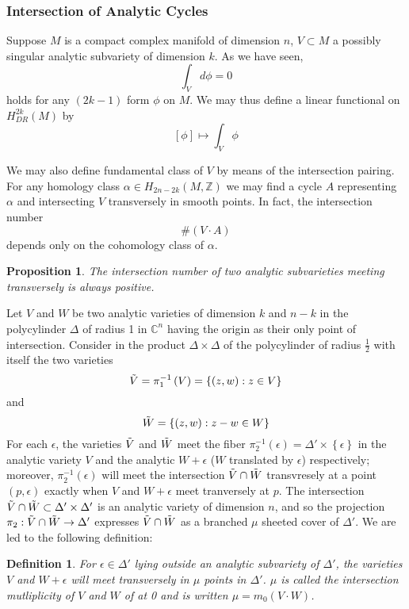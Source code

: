 \documentclass{article}
\newtheorem{defn}{Definition}
\newtheorem{prop}{Proposition}
\begin{document}
\subsubsection{Intersection of Analytic Cycles}

\indent Suppose $M$ is a compact complex manifold of dimension $n$, $V \subset M$ a possibly singular analytic subvariety of dimension $k$. As we have seen, 
\[
	\int_V d\phi = 0
\]
holds for any $(2k-1)$ form $  \phi$ on $M$. We may thus define a linear functional on $H^{2k}_{DR} (M)$ by 
\[
	\left[ \phi \right] \mapsto \int_V \phi
\]

We may also define fundamental class of $V$ by means of the intersection pairing. For any homology class $ \alpha \in H_{2n-2k} \left( M, \mathbb{Z} \right) $ we may find a cycle $A$ representing $ \alpha$ and intersecting $V$ transversely in smooth points. In fact, the intersection number
\[
	\# \left( V \cdot A \right)
\]
depends only on the cohomology class of $ \alpha $.

\begin{prop}
	The intersection number of two analytic subvarieties meeting transversely is always positive.
\end{prop}

Let $V$ and $W$ be two analytic varieties of dimension $k$ and $n-k$ in the polycylinder $\Delta$ of radius 1 in $ \mathbb{C}^n$ having the origin as their only point of intersection. Consider in the product $ \Delta \times \Delta$ of the polycylinder of radius $ \frac{1}{2} $ with itself the two varieties
\[
	\Tilde{V} = \pi_1^{-1} \left( V \right) = \left\{ \left( z,w \right): z \in V \right\} 
\]
and
\[
	\Tilde{W} = \left\{ (z,w): z-w \in W \right\}
\]
For each $ \epsilon $, the varieties $ \Tilde{V}$ and $ \Tilde{W}$ meet the fiber $ \pi_2^{-1} \left( \epsilon \right) = \Delta' \times \left\{ \epsilon \right\}$ in the analytic variety $V$ and the analytic $W + \epsilon$ ($W$ translated by $ \epsilon$) respectively; moreover, $ \pi_2^{-1} \left( \epsilon \right)$ will meet the intersection $ \Tilde{V} \cap \Tilde{W}$ transvresely at a point $ \left( p, \epsilon \right)$ exactly when $V$ and $ W + \epsilon$ meet tranversely at $p$. The intersection $ \Tilde{V} \cap \Tilde{W} \subset \Delta' \times \Delta'$ is an analytic variety of dimension $n$, and so the projection $ \pi_2: \Tilde{V} \cap \Tilde{W} \to \Delta'$ expresses $ \Tilde{V} \cap \Tilde{W}$ as a branched $ \mu$ sheeted cover of $ \Delta'$. We are led to the following definition:

\begin{defn}
	For $ \epsilon \in \Delta'$ lying outside an analytic subvariety of $ \Delta'$, the varieties $V$ and $W + \epsilon$ will meet transversely in $ \mu$ points in $ \Delta'$. $ \mu$ is called the \textit{intersection mutliplicity} of $V$ and $W$ of at 0 and is written $ \mu = m_0 (V \cdot W)$.
\end{defn}
\end{document}
